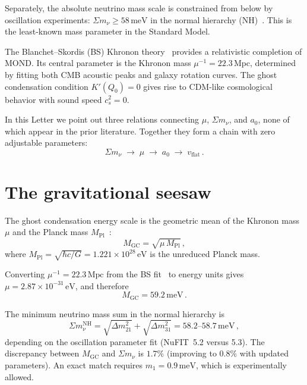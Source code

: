 \documentclass[prl,twocolumn,superscriptaddress,longbibliography]{revtex4-2}
\newcommand{\Mpc}{\,\mathrm{Mpc}}
\newcommand{\eV}{\,\mathrm{eV}}
\newcommand{\meV}{\,\mathrm{meV}}
\newcommand{\MPl}{M_{\mathrm{Pl}}}
\newcommand{\MGC}{M_{\mathrm{GC}}}
\newcommand{\azero}{a_0}
\newcommand{\sumnu}{\Sigma m_\nu}
\begin{document}
Separately, the absolute neutrino mass scale is constrained
from below by oscillation experiments:
$\sumnu \geq 58\meV$ in the normal hierarchy (NH)~\cite{NuFIT}.
This is the least-known mass parameter in the Standard Model.

The Blanchet--Skordis (BS) Khronon theory~\cite{BS2024,BS2025}
provides a relativistic completion of MOND.
Its central parameter is the Khronon mass
$\mu^{-1} = 22.3\Mpc$, determined by fitting both CMB
acoustic peaks and galaxy rotation curves.
The ghost condensation condition $K'(Q_0) = 0$
gives rise to CDM-like cosmological behavior
with sound speed $c_s^2 = 0$.

In this Letter we point out three relations connecting
$\mu$, $\sumnu$, and $\azero$, none of which appear
in the prior literature. Together they form a chain with
zero adjustable parameters:
\begin{equation}
  \sumnu \;\longrightarrow\; \mu \;\longrightarrow\;
  \azero \;\longrightarrow\; v_{\mathrm{flat}} \,.
\end{equation}

\section{The gravitational seesaw}

The ghost condensation energy scale is the geometric mean
of the Khronon mass $\mu$ and the Planck mass $\MPl$~\cite{ArkaniHamed2004}:
\begin{equation}\label{eq:MGC}
  \MGC = \sqrt{\mu\,\MPl} \,,
\end{equation}
where $\MPl = \sqrt{\hbar c/G} = 1.221 \times 10^{28}\eV$
is the unreduced Planck mass.

Converting $\mu^{-1} = 22.3\Mpc$ from the BS fit~\cite{BS2025}
to energy units gives $\mu = 2.87 \times 10^{-31}\eV$, and therefore
\begin{equation}
  \MGC = 59.2\meV \,.
\end{equation}

The minimum neutrino mass sum in the normal hierarchy is~\cite{NuFIT}
\begin{equation}
  \sumnu^{\mathrm{NH}} = \sqrt{\Delta m_{21}^2} + \sqrt{\Delta m_{31}^2}
  = 58.2\text{--}58.7\meV \,,
\end{equation}
depending on the oscillation parameter fit (NuFIT~5.2 versus 5.3).
The discrepancy between $\MGC$ and $\sumnu$ is $1.7\%$
(improving to $0.8\%$ with updated parameters).
An exact match requires $m_1 = 0.9\meV$, which is experimentally allowed.
\end{document}
